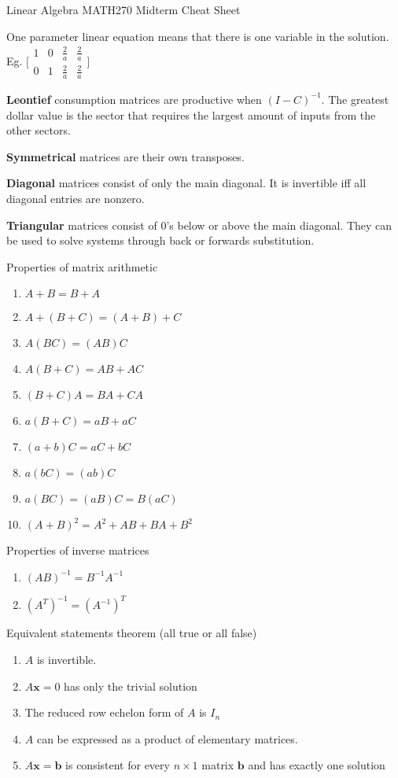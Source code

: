 \documentclass[11pt, letterpaper, twoside]{article}
\begin{document}
Linear Algebra MATH270 Midterm Cheat Sheet
\vspace{0.2cm}

One parameter linear equation means that there is one variable in the solution. Eg. $\big[\begin{smallmatrix}
	1 & 0 & \frac{2}{a} & \frac{2}{a}\\
	0 & 1 & \frac{2}{a} & \frac{2}{a}
\end{smallmatrix}\big]$

\textbf{Leontief} consumption matrices are productive when \((I-C)^{-1}\). The greatest dollar value is the sector that requires the largest amount of inputs from the other sectors.

\textbf{Symmetrical} matrices are their own transposes.

\textbf{Diagonal} matrices consist of only the main diagonal. It is invertible iff all diagonal entries are nonzero.

\textbf{Triangular} matrices consist of 0's below or above the main diagonal. They can be used to solve systems through back or forwards substitution.

\begin{multicols}{2}
\vspace{2mm}
Properties of matrix arithmetic %
\begin{enumerate}[label=\alph*)]
\item \(A+B=B+A\)
\item \(A+(B+C)=(A+B)+C\)
\item \(A(BC)=(AB)C\)
\item \(A(B+C)=AB+AC\)
\item \((B+C)A=BA+CA\)
\item \(a(B+C)=aB+aC\)
\item \((a+b)C=aC+bC\)
\item \(a(bC)=(ab)C\)
\item \(a(BC)=(aB)C=B(aC)\)
\item \((A+B)^2=A^2+AB+BA+B^2\)
\end{enumerate}
\columnbreak
Properties of inverse matrices %
\begin{enumerate}[label=\alph*)]
    \item \((AB)^{-1}=B^{-1}A^{-1}\)
    \item \((A^T)^{-1}=(A^{-1})^T\)
\end{enumerate}

Equivalent statements theorem (all true or all false)
\begin{enumerate}[label=-]
\item \(A\) is invertible.
\item \(A\mathbf{x}=0\) has only the trivial solution
\item The reduced row echelon form of \(A\) is \(I_n\)
\item \(A\) can be expressed as a product of elementary matrices. 
\item \(A\mathbf{x}=\mathbf{b}\) is consistent for every \(n\times1\) matrix \(\mathbf{b}\) and has exactly one solution
\end{enumerate}
\end{multicols}
\end{document}
